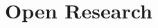 \documentclass[draft]{agujournal2019}
\begin{document}

\section{Open Research}



%


\end{document}
